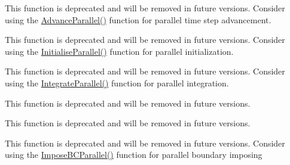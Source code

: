 
\begin{DoxyRefList}
\item[Member \mbox{\hyperlink{classLidDrivenCavity_a0456e69240df3932761fc3820fde0bed}{Lid\+Driven\+Cavity\+::Advance}} (bool verbose\+\_\+advance)]\label{deprecated__deprecated000004}%
%
This function is deprecated and will be removed in future versions. Consider using the \mbox{\hyperlink{classLidDrivenCavity_ad6f85225e7526cd7f9f3c3fc48d8d3b0}{Advance\+Parallel()}} function for parallel time step advancement. 
\item[Member \mbox{\hyperlink{classLidDrivenCavity_ab0eb448219134e835173e94874a3983a}{Lid\+Driven\+Cavity\+::Initialise}} ()]\label{deprecated__deprecated000002}%
%
This function is deprecated and will be removed in future versions. Consider using the \mbox{\hyperlink{classLidDrivenCavity_abd03496713e6fd52c2a88d94a8da6050}{Initialise\+Parallel()}} function for parallel initialization. 
\item[Member \mbox{\hyperlink{classLidDrivenCavity_a80cd7032d10f09279d62d03335023e72}{Lid\+Driven\+Cavity\+::Integrate}} ()]\label{deprecated__deprecated000003}%
%
This function is deprecated and will be removed in future versions. Consider using the \mbox{\hyperlink{classLidDrivenCavity_ac458ad4869ad3da2bb74e5500519298a}{Integrate\+Parallel()}} function for parallel integration. 
\item[Member \mbox{\hyperlink{classLidDrivenCavity_ae9194a027b9adec8c5f8a7031ca8266a}{Lid\+Driven\+Cavity\+::Scatter\+Domain}} (double $\ast$\+A\+\_\+local, double $\ast$\+A\+\_\+global)]\label{deprecated__deprecated000001}%
%
This function is deprecated and will be removed in future versions. 
\item[Member \mbox{\hyperlink{classSolverCG_af07949ab7beaa99ee197660aa68efd21}{Solver\+CG\+::Gather\+Domain}} (double $\ast$\+A\+\_\+local, double $\ast$\+A\+\_\+global)]\label{deprecated__deprecated000005}%
%
This function is deprecated and will be removed in future versions.  
\item[Member \mbox{\hyperlink{classSolverCG_a252ab61ae011d656c12926681ee234dd}{Solver\+CG\+::Impose\+BC}} (double $\ast$p)]\label{deprecated__deprecated000008}%
%
This function is deprecated and will be removed in future versions. Consider using the \mbox{\hyperlink{classSolverCG_a4c829516d18272febbb4b9f7c9508d9d}{Impose\+BCParallel()}} function for parallel boundary imposing  

\end{DoxyRefList}
